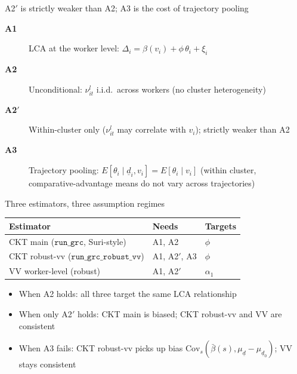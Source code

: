 \documentclass[10pt,aspectratio=169]{beamer}
\newcommand{\thetai}{\theta_{i}}
\newcommand{\Deltai}{\Delta_{i}}
\newcommand{\phicoef}{\phi}
\newcommand{\mud}{\mu_{\underline{d}}}
\newcommand{\vii}{v_{i}}
\newcommand{\nuil}{\nu_{it}^{l}}
\begin{document}
%
\begin{frame}{A2$'$ is strictly weaker than A2; A3 is the cost of trajectory pooling}

  \begin{description}
    \item[\textbf{A1}] LCA at the worker level: $\Deltai = \beta(\vii) + \phicoef\,\thetai + \xi_i$
    \item[\textbf{A2}] Unconditional: $\nuil$ i.i.d.\ across workers (no cluster heterogeneity)
    \item[\textbf{A2$'$}] Within-cluster only ($\nuil$ may correlate with $\vii$); strictly weaker than A2
    \item[\textbf{A3}] Trajectory pooling: $E[\theta_i \mid \underline{d}_i, \vii] = E[\theta_i \mid \vii]$ (within cluster, comparative-advantage means do not vary across trajectories)
  \end{description}

\end{frame}

\begin{frame}{Three estimators, three assumption regimes}

  \begin{center}
  \begin{tabular}{lll}
    \toprule
    Estimator                                & Needs        & Targets      \\
    \midrule
    CKT main ($\texttt{run\_grc}$, Suri-style) & A1, A2       & $\phicoef$   \\
    CKT robust-vv ($\texttt{run\_grc\_robust\_vv}$) & A1, A2$'$, A3 & $\phicoef$   \\
    VV worker-level (robust)                 & A1, A2$'$    & $\alpha_1$   \\
    \bottomrule
  \end{tabular}
  \end{center}

  \vspace{0.4em}
  \begin{itemize}
    \item When A2 holds: all three target the same LCA relationship
    \item When only A2$'$ holds: CKT main is biased; CKT robust-vv and VV are consistent
    \item When A3 fails: CKT robust-vv picks up bias $\mathrm{Cov}_s(\bar\beta(s), \mud - \mu_{\underline{d}_0})$; VV stays consistent
  \end{itemize}

\end{frame}
\end{document}
